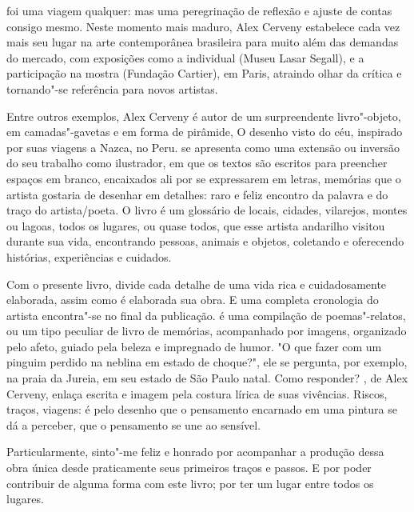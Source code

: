\begin{multicols}{2}
{\small{}}

\vspace{\baselineskip}

\noindent{}foi uma viagem qualquer: mas uma peregrinação de reflexão e ajuste de contas consigo mesmo. Neste momento mais maduro, Alex Cerveny estabelece cada vez mais seu lugar na arte contemporânea brasileira para muito além das demandas do mercado, com exposições como a individual {} (Museu Lasar Segall), e a participação na mostra {} (Fundação Cartier), em Paris, atraindo olhar da crítica e tornando"-se referência para novos artistas. 

Entre outros exemplos, Alex Cerveny é autor de um surpreendente livro"-objeto, em camadas"-gavetas e em forma de pirâmide, O desenho visto do céu, inspirado por suas viagens a Nazca, no Peru. {} se apresenta como uma extensão ou inversão do seu trabalho como ilustrador, em que os textos são escritos para preencher espaços em branco, encaixados ali por se expressarem em letras, memórias que o artista gostaria de desenhar em detalhes: raro e feliz encontro da palavra e do traço do artista/poeta. O livro é um glossário de locais, cidades, vilarejos, montes ou lagoas, todos os lugares, ou quase todos, que esse artista andarilho visitou durante sua vida, encontrando pessoas, animais e objetos, coletando e oferecendo histórias, experiências e cuidados. 

Com o presente livro, divide cada
detalhe de uma vida rica e cuidadosamente elaborada, assim como é elaborada sua obra. E uma completa cronologia do artista encontra"-se no final da publicação. {} é uma compilação de poemas"-relatos, ou um tipo peculiar de livro de memórias, acompanhado por imagens, organizado pelo afeto, guiado pela beleza e impregnado de humor. "O que fazer com um pinguim perdido na neblina em estado de choque?", ele se pergunta, por exemplo, na praia da Jureia, em seu estado de São Paulo natal. Como responder? {}, de Alex Cerveny, enlaça escrita e imagem pela costura lírica de suas vivências. Riscos, traços, viagens: é pelo desenho que o pensamento encarnado em uma pintura se dá a perceber, que o pensamento se une ao sensível. 

Particularmente, sinto"-me feliz e honrado por acompanhar a produção dessa obra única desde praticamente seus primeiros traços e passos. E por poder contribuir de alguma forma com este livro; por ter um lugar entre todos os lugares.

\bigskip

\noindent{}\textcolor{gray}{\footnotesize{}}
\end{multicols}

